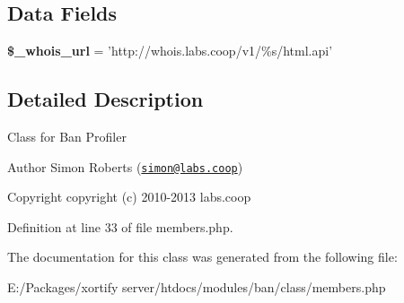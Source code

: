 \subsection*{Data Fields}
\begin{DoxyCompactItemize}
\item 
\hypertarget{classban_members_aaa3a9523dd2f6a3e73052c799a1dbcdb}{{\bfseries \$\-\_\-whois\-\_\-url} = 'http\-://whois.\-labs.\-coop/v1/\%s/html.\-api'}\label{classban_members_aaa3a9523dd2f6a3e73052c799a1dbcdb}

\end{DoxyCompactItemize}


\subsection{Detailed Description}
Class for Ban Profiler \begin{DoxyAuthor}{Author}
Simon Roberts (\href{mailto:simon@labs.coop}{\tt simon@labs.\-coop}) 
\end{DoxyAuthor}
\begin{DoxyCopyright}{Copyright}
copyright (c) 2010-\/2013 labs.\-coop 
\end{DoxyCopyright}


Definition at line 33 of file members.\-php.



The documentation for this class was generated from the following file\-:\begin{DoxyCompactItemize}
\item 
E\-:/\-Packages/xortify server/htdocs/modules/ban/class/members.\-php\end{DoxyCompactItemize}
